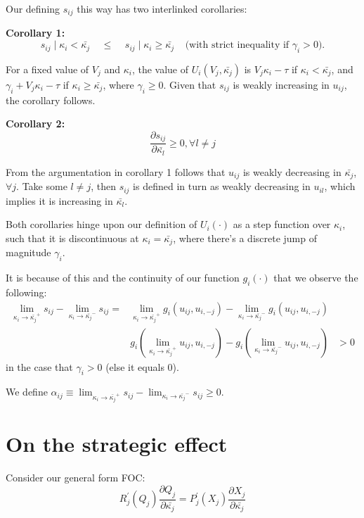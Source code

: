 \documentclass{article}
\begin{document}
Our defining $s_{ij}$ this way has two interlinked corollaries:

\textbf{Corollary 1:}
\[s_{ij} \mid \kappa_i < \bar{\kappa_j} \;\;\;\; \leq     \;\;\;\; s_{ij} \mid \kappa_i \geq \bar{\kappa_j} \;\;\;\; \text{(with strict inequality if $\gamma_i > 0$).}\]

For a fixed value of $V_j$ and $\kappa_i$, the value of $U_i(V_j, \bar{\kappa_j})$ is $V_j \kappa_i - \tau$ if $\kappa_i < \bar{\kappa_j}$, and $\gamma_i + V_j \kappa_i - \tau$ if $\kappa_i \geq \bar{\kappa_j}$, where $\gamma_i \geq 0$. Given that $s_{ij}$ is weakly increasing in $u_{ij}$, the corollary follows.

\textbf{Corollary 2:}
\[ \frac{\partial s_{ij}}{\partial\bar{\kappa_{l}}} \geq 0, \forall l \neq j \]

From the argumentation in corollary 1 follows that $u_{ij}$ is weakly decreasing in $\bar{\kappa_j}$, $\forall j$. Take some $l \neq j$, then $s_{ij}$ is defined in turn as weakly decreasing in $u_{il}$, which implies it is increasing in $\bar{\kappa_l}$.

Both corollaries hinge upon our definition of $U_i(\cdot)$ as a step function over $\kappa_i$, such that it is discontinuous at $\kappa_i = \bar{\kappa_j}$, where there’s a discrete jump of magnitude  $\gamma_i$.

It is because of this and the continuity of our function $g_i(\cdot)$ that we observe the following:
\begin{align*}
    \lim_{\kappa_i \to\bar{\kappa_j}^+} s_{ij} - \lim_{\kappa_i \to\bar{\kappa_j}^-} s_{ij} = & \lim_{\kappa_i \to\bar{\kappa_j}^+} g_i(u_{ij}, u_{i,-j}) - \lim_{\kappa_i \to\bar{\kappa_j}^-} g_i(u_{ij}, u_{i,-j}) & \\
    &  g_i(\lim_{\kappa_i \to\bar{\kappa_j}^+} u_{ij}, u_{i,-j}) -  g_i(\lim_{\kappa_i \to\bar{\kappa_j}^-} u_{ij}, u_{i,-j}) & > 0
\end{align*}
in the case that $\gamma_i > 0$ (else it equals $0$).

We define $\alpha_{ij} \equiv \lim_{\kappa_i \to\bar{\kappa_j}^+} s_{ij} - \lim_{\kappa_i \to\bar{\kappa_j}^-} s_{ij} \geq 0$.

\section{On the strategic effect}

Consider our general form FOC:
\begin{equation*}
 R_j^{\prime}(Q_j)\frac{\partial Q_j}{\partial\bar{\kappa_j}} = P_j^{\prime}(X_j)\frac{\partial X_j}{\partial \bar{\kappa_j}} 
\end{equation*}
\end{document}
